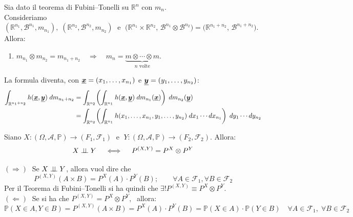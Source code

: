 \begin{teorema}

Sia dato il teorema di Fubini--Tonelli su $\mathbb{R}^n$ con $m_n$.\\
Consideriamo $(\mathbb{R}^{n_1}, \mathcal{B}^{n_1}, m_{n_1}),\;(\mathbb{R}^{n_2}, \mathcal{B}^{n_2}, m_{n_2})\;\text{ e }\;\bigl(\mathbb{R}^{n_1} \times \mathbb{R}^{n_2},\, \mathcal{B}^{n_1} \otimes \mathcal{B}^{n_2}\bigr)
= \bigl(\mathbb{R}^{n_1+n_2},\, \mathcal{B}^{n_1+n_2}\bigr)$.\\
Allora:
\begin{enumerate}[label=\arabic*)]
    \item $m_{n_1} \otimes m_{n_2} = m_{n_1+n_2} \quad \Rightarrow\quad  
    m_n = \underbrace{m \otimes \cdots \otimes m}_{n \text{ volte}}$.
\end{enumerate}

La formula diventa, con $\underline{{\boldsymbol{x}}} = (x_1,\dots,x_{n_1})$ e $\underline{{\boldsymbol{y}}} = (y_1,\dots,y_{n_2})$:
\begin{align*}
\int_{\mathbb{R}^{n_1 +n_2}} h(\underline{{\boldsymbol{x}}},\underline{{\boldsymbol{y}}})\; dm_{n_1+n_2}
&= \int_{\mathbb{R}^{n_2}}\!\left(\int_{\mathbb{R}^{n_1}} h(\underline{{\boldsymbol{x}}},\underline{{\boldsymbol{y}}})\; dm_{n_1}(\underline{{\boldsymbol{x}}})\right)\;dm_{n_2}(\underline{{\boldsymbol{y}}})\\
&= \int_{\mathbb{R}^{n_2}}\!\left(\int_{\mathbb{R}^{n_1}} h(x_1,\dots,x_{n_1}, y_1,\dots,y_{n_2})
\; dx_1\cdots dx_{n_1}\right)\; dy_1\cdots dy_{n_2}
\end{align*}

\end{teorema}

\begin{corollario}
    Siano $X:(\Omega, \mathcal{A}, \mathbb{P})\to(F_1, \mathcal{F}_1)\;\text{ e }\;Y:(\Omega, \mathcal{A}, \mathbb{P})\to(F_2, \mathcal{F}_2)$. Allora:
    \[X\mathrel{\perp\!\!\!\perp} Y\quad \iff \quad P^{(X, Y)}= P^X \otimes P^Y\]
    \begin{dimostrazione}
        $(\Rightarrow)\;$ Se $X\mathrel{\perp\!\!\!\perp} Y$, allora vuol dire che \[P^{(X, Y)}(A\times B)=P^X(A)\cdot P^Y(B);\qquad\forall A\in\mathcal{F}_1, \forall B\in\mathcal{F}_2\]
        Per il Teorema di Fubini--Tonelli si ha quindi che $\exists! P^{(X, Y)}\equiv P^X\otimes P^Y$.\\
        $(\Leftarrow)\;$ Se si ha che $P^{(X, Y)}= P^X\otimes P^Y,\;$ allora:
        \[\mathbb{P}(X\in A, Y\in B) = P^{(X, Y)}(A\times B) = P^X(A)\cdot P^Y(B) = \mathbb{P}(X\in A)\cdot\mathbb{P}(Y\in B)\quad \forall A\in\mathcal{F}_1, \;\forall B\in\mathcal{F}_2\]
    \end{dimostrazione}
\end{corollario}

